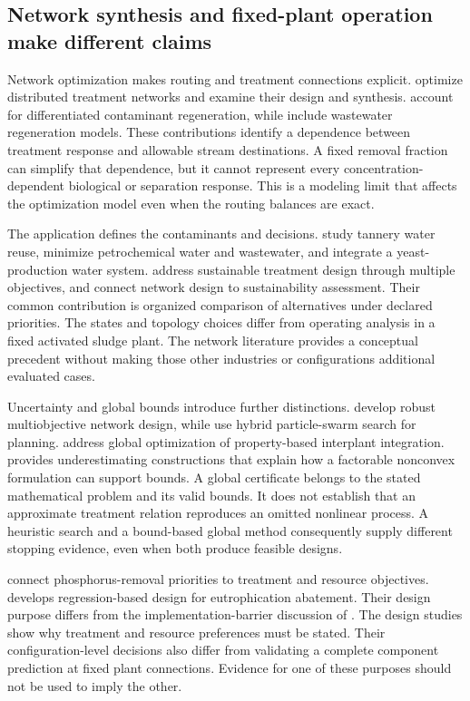 \subsection{Network synthesis and fixed-plant operation make different claims}

Network optimization makes routing and treatment connections explicit. \citet{Galan1998} optimize distributed treatment networks and \citet{Galan1999} examine their design and synthesis. \citet{GuelliSouza2011} account for differentiated contaminant regeneration, while \citet{YangNetwork2014} include wastewater regeneration models. These contributions identify a dependence between treatment response and allowable stream destinations. A fixed removal fraction can simplify that dependence, but it cannot represent every concentration-dependent biological or separation response. This is a modeling limit that affects the optimization model even when the routing balances are exact.

The application defines the contaminants and decisions. \citet{Gutterres2010} study tannery water reuse, \citet{Hansen2018} minimize petrochemical water and wastewater, and \citet{Xu2015} integrate a yeast-production water system. \citet{PadronPaez2020} address sustainable treatment design through multiple objectives, and \citet{Aboagye2021} connect network design to sustainability assessment. Their common contribution is organized comparison of alternatives under declared priorities. The states and topology choices differ from operating analysis in a fixed activated sludge plant. The network literature provides a conceptual precedent without making those other industries or configurations additional evaluated cases.

Uncertainty and global bounds introduce further distinctions. \citet{Tosarkani2020} develop robust multiobjective network design, while \citet{Ye2019} use hybrid particle-swarm search for planning. \citet{RubioCastro2013} address global optimization of property-based interplant integration. \citet{McCormick1976} provides underestimating constructions that explain how a factorable nonconvex formulation can support bounds. A global certificate belongs to the stated mathematical problem and its valid bounds. It does not establish that an approximate treatment relation reproduces an omitted nonlinear process. A heuristic search and a bound-based global method consequently supply different stopping evidence, even when both produce feasible designs.

\citet{DamalerioRemoval2022} connect phosphorus-removal priorities to treatment and resource objectives. \citet{Selerio2022} develops regression-based design for eutrophication abatement. Their design purpose differs from the implementation-barrier discussion of \citet{DamalerioBarriers2022}. The design studies show why treatment and resource preferences must be stated. Their configuration-level decisions also differ from validating a complete component prediction at fixed plant connections. Evidence for one of these purposes should not be used to imply the other.

